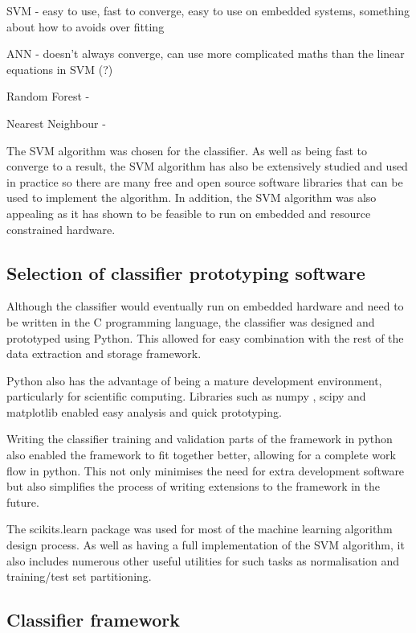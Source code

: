 SVM - easy to use, fast to converge, easy to use on embedded systems, something about how to avoids over fitting

ANN - doesn't always converge, can use more complicated maths than the linear equations in SVM (?)

Random Forest - 

Nearest Neighbour - 

The SVM algorithm was chosen for the classifier. As well as being fast to converge to a result, the SVM algorithm has also be extensively studied and used in practice so there are many free and open source software libraries that can be used to implement the algorithm. In addition, the SVM algorithm was also appealing as it has shown to be feasible to run on embedded and resource constrained hardware. 

\subsection{Selection of classifier prototyping software}

Although the classifier would eventually run on embedded hardware and need to be written in the C programming language, the classifier was designed and prototyped using Python. This allowed for easy combination with the rest of the data extraction and storage framework. 

Python also has the advantage of being a mature development environment, particularly for scientific computing. Libraries such as numpy \cite{numpy}, scipy \cite{scipy} and matplotlib \cite{matplotlib} enabled easy analysis and quick prototyping. 

Writing the classifier training and validation parts of the framework in python also enabled the framework to fit together better, allowing for a complete work flow in python. This not only minimises the need for extra development software but also simplifies the process of writing extensions to the framework in the future. 

The scikits.learn package was used for most of the machine learning algorithm design process. As well as having a full implementation of the SVM algorithm, it also includes numerous other useful utilities for such tasks as normalisation and training/test set partitioning. 

\subsection{Classifier framework}

